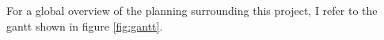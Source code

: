 \documentclass[twoside,single]{lion-msc}
\begin{document}
    For a global overview of the planning surrounding this project, I refer to the gantt shown in figure \ref{fig:gantt}.









%

\renewcommand\refname{}


\end{document}
